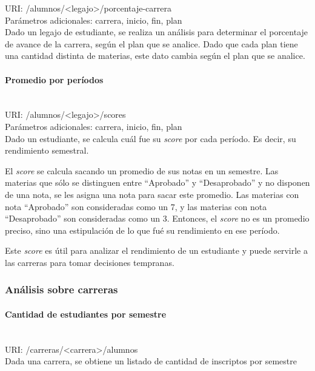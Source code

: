URI: /alumnos/<legajo>/porcentaje-carrera \\

Parámetros adicionales: carrera, inicio, fin, plan \\

Dado un legajo de estudiante, se realiza un análisis para determinar el porcentaje de avance de la carrera, según el plan que se analice. Dado que cada plan tiene una cantidad distinta de materias, este dato cambia según el plan que se analice.

\paragraph{Promedio por períodos}\mbox{}\\

URI: /alumnos/<legajo>/scores \\

Parámetros adicionales: carrera, inicio, fin, plan \\

Dado un estudiante, se calcula cuál fue su \textit{score} por cada período. Es decir, su rendimiento semestral. 

El \textit{score} se calcula sacando un promedio de sus notas en un semestre. Las materias que sólo se distinguen entre “Aprobado” y “Desaprobado” y no disponen de una nota, se les asigna una nota para sacar este promedio.
Las materias con nota “Aprobado” son consideradas como un 7, y las materias con nota “Desaprobado” son consideradas como un 3. Entonces, el \textit{score} no es un promedio preciso, sino una estipulación de lo que fué su rendimiento en ese período.

Este \textit{score} es útil para analizar el rendimiento de un estudiante y puede servirle a las carreras para tomar decisiones tempranas.

\subsubsection{Análisis sobre carreras}

\paragraph{Cantidad de estudiantes por semestre}\mbox{}\\

URI: /carreras/<carrera>/alumnos \\

Dada una carrera, se obtiene un listado de cantidad de inscriptos por semestre



